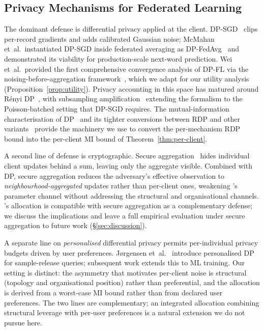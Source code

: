 \subsection{Privacy Mechanisms for Federated Learning}
\label{sec:related-defense}

The dominant defense is differential privacy applied at the client.
DP-SGD~\cite{abadi2016dpsgd} clips per-record gradients and adds
calibrated Gaussian noise; McMahan et~al.\ instantiated DP-SGD inside
federated averaging as DP-FedAvg~\cite{mcmahan2018dpfedavg} and
demonstrated its viability for production-scale next-word prediction.
Wei et~al.\ provided the first comprehensive convergence analysis of
DP-FL via the noising-before-aggregation framework~\cite{wei2020nbafl},
which we adapt for our utility analysis (Proposition~\ref{prop:utility}).
Privacy accounting in this space has matured around R\'enyi
DP~\cite{mironov2017rdp}, with subsampling
amplification~\cite{wang2019subsampled} extending the formalism to the
Poisson-batched setting that DP-SGD requires. The mutual-information
characterisation of DP~\cite{cuff2016mi} and its tighter conversions
between RDP and other variants~\cite{asoodeh2021variants} provide the
machinery we use to convert the per-mechanism RDP bound into the
per-client MI bound of Theorem~\ref{thm:per-client}.

A second line of defense is cryptographic. Secure
aggregation~\cite{bonawitz2017secagg} hides individual client updates
behind a sum, leaving only the aggregate visible. Combined with DP,
secure aggregation reduces the adversary's effective observation to
\emph{neighbourhood-aggregated} updates rather than per-client ones,
weakening \TADI's parameter channel without addressing the structural
and organisational channels. \Fulcrum's allocation is compatible with
secure aggregation as a complementary defense; we discuss the
implications and leave a full empirical evaluation under secure
aggregation to future work (\S\ref{sec:discussion}).

A separate line on \emph{personalised} differential privacy
permits per-individual privacy budgets driven by user preferences.
J{\o}rgensen et~al.~\cite{jorgensen2015personalized} introduce
personalised DP for sample-release queries; subsequent work extends
this to ML training. Our setting is distinct: the asymmetry that
motivates per-client noise is structural (topology and organisational
position) rather than preferential, and the allocation is derived
from a worst-case MI bound rather than from declared user
preferences. The two lines are complementary; an integrated
allocation combining structural leverage with per-user preferences
is a natural extension we do not pursue here.

